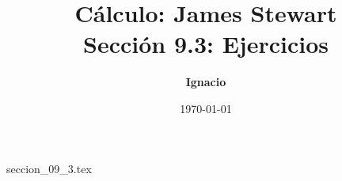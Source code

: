 \documentclass[11pt,spanish,oneside]{report}
\title{\textbf{Cálculo: James Stewart} \\ \Large Sección 9.3: Ejercicios}
\author{\textbf{Ignacio}}
\date{\today}
\begin{document}
\maketitle

{seccion_09_3.tex}
\end{document}
